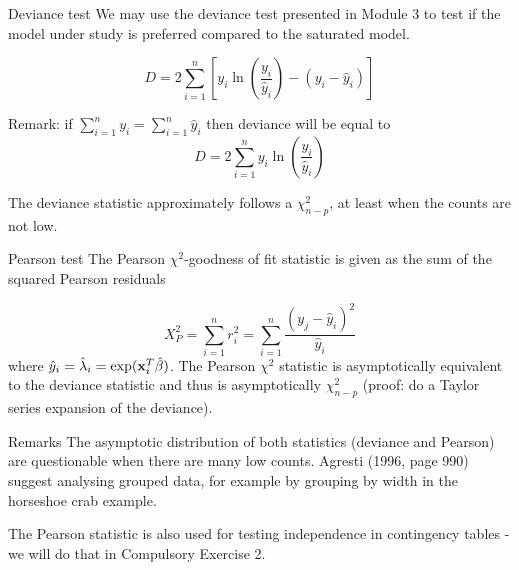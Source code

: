 \documentclass[
  ignorenonframetext,
]{beamer}
\begin{document}
\begin{frame}
\begin{block}{Deviance test}
\protect\hypertarget{deviance-test-1}{}
We may use the deviance test presented in Module 3 to test if the model
under study is preferred compared to the saturated model.

\[ D=2 \sum_{i=1}^n [y_i\ln(\frac{y_i}{\hat{y}_i})-(y_i-\hat{y}_i)]\]

Remark: if \(\sum_{i=1}^n y_i=\sum_{i=1}^n \hat{y}_i\) then deviance
will be equal to \[ D=2 \sum_{i=1}^n y_i\ln(\frac{y_i}{\hat{y}_i})\]

The deviance statistic approximately follows a \(\chi^2_{n-p}\), at
least when the counts are not low.
\end{block}
\end{frame}

\begin{frame}
\begin{block}{Pearson test}
\protect\hypertarget{pearson-test}{}
The Pearson \(\chi^2\)-goodness of fit statistic is given as the sum of
the squared Pearson residuals

\[ X_P^2=\sum_{i=1}^n r_i^2=\sum_{i=1}^n  \frac{(y_j-\hat{y}_i)^2}{\hat{y}_i}\]
where \(\hat{y}_i=\hat{\lambda}_i=\exp({\bf x}_i^T\hat{\beta})\). The
Pearson \(\chi^2\) statistic is asymptotically equivalent to the
deviance statistic and thus is asymptotically \(\chi^2_{n-p}\) (proof:
do a Taylor series expansion of the deviance).
\end{block}
\end{frame}

\begin{frame}
\begin{block}{Remarks}
\protect\hypertarget{remarks}{}
The asymptotic distribution of both statistics (deviance and Pearson)
are questionable when there are many low counts. Agresti (1996, page
990) suggest analysing grouped data, for example by grouping by width in
the horseshoe crab example.

The Pearson statistic is also used for testing independence in
contingency tables - we will do that in Compulsory Exercise 2.
\end{block}
\end{frame}
\end{document}
